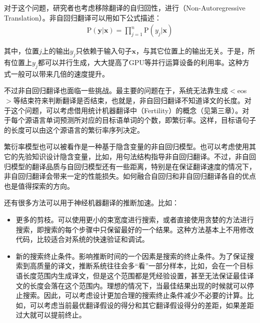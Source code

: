 \parinterval 对于这个问题，研究者也考虑移除翻译的自归回性\cite{Gu2017NonAutoregressiveNM}，进行{\small{}}（Non-Autoregressive Translation）。非自回归翻译可以用如下公式描述：
\begin{eqnarray}
\textrm{P}(\mathbf{y}|\mathbf{x}) = \prod_{j=1}^{n} \textrm{P}(y_j| \mathbf{x})
\label{eq:7-7}
\end{eqnarray}

\noindent 其中，位置$j$上的输出$y_j$只依赖于输入句子$\mathbf{x}$，与其它位置上的输出无关。于是，所有位置上$y_j$都可以并行生成，大大提高了GPU等并行运算设备的利用率。这种方式一般可以带来几倍的速度提升。

\parinterval 不过非自回归翻译也面临一些挑战。最主要的问题在于，系统无法靠生成$<$eos$>$等结束符来判断翻译是否结束，也就是，非自回归翻译不知道译文的长度。对于这个问题，可以考虑借用统计机器翻译中{\small{}}（Fertility）的概念（见第三章）。对于每个源语言单词预测所对应的目标语单词的个数，即繁衍率。这样，目标语句子的长度可以由这个源语言的繁衍率序列决定。

\parinterval 繁衍率模型也可以被看作是一种基于隐含变量的非自回归模型。也可以考虑使用其它的先验知识设计隐含变量，比如，用句法结构指导非自回归翻译\cite{Gu2017NonAutoregressiveNM}。不过，非自回归模型的翻译品质与自回归模型还有一些距离，特别是在保证翻译速度的情况下，非自回归翻译会带来一定的性能损失。如何融合自回归和非自回归翻译各自的优点也是值得探索的方向。

\vspace{0.5em}
\vspace{0.5em}

\parinterval 还有很多方法可以用于神经机器翻译的推断加速。比如：

\begin{itemize}
\vspace{0.5em}
\item 更多的剪枝。可以使用更小的束宽度进行搜索，或者直接使用贪婪的方法进行搜索，即搜索的每个步骤中只保留最好的一个结果。这种方法基本上不用修改代码，比较适合对系统的快速验证和调试。
\vspace{0.5em}
\item 新的搜索终止条件。影响推断时间的一个因素是搜索的终止条件。为了保证搜索到高质量的译文，推断系统往往会多``看''一部分样本，比如，会在一个目标语长度范围内生成译文，但是这个范围都是凭经验设置，甚至无法保证最佳译文的长度会落在这个范围内。理想的情况下，当最佳结果出现的时候就可以停止搜索。因此，可以考虑设计更加合理的搜索终止条件减少不必要的计算\cite{DBLP:conf/emnlp/HuangZM17}。比如，可以考虑当前最优翻译假设的得分和其它翻译假设得分的差距，如果差距过大就可以提前终止。
\vspace{0.5em}
\end{itemize}

